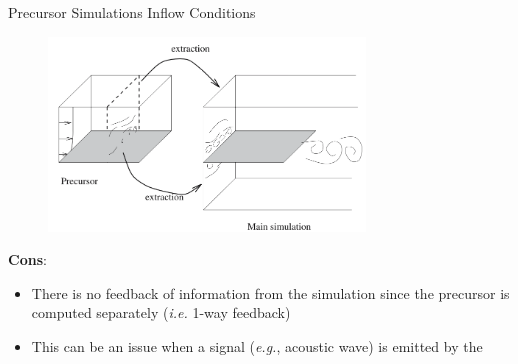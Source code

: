 \begin{frame}{Precursor Simulations Inflow Conditions}
	\begin{figure}
		\includegraphics[width=0.75\textwidth]{inlet3}
	\end{figure}
	\textbf{Cons}:
	\begin{itemize}
	\item There is no feedback of information from the  simulation since the precursor is computed separately (\textit{i.e.} 1-way feedback)
	\item This can be an issue when a signal (\textit{e.g.}, acoustic wave) is emitted by the 
	\end{itemize}
\end{frame}

